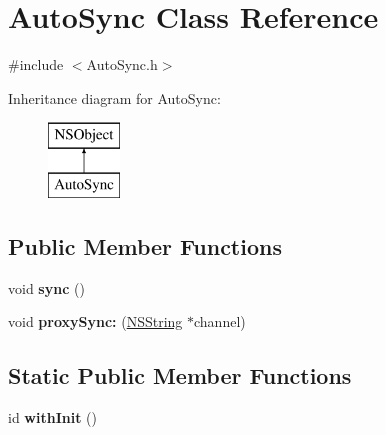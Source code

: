 \hypertarget{interface_auto_sync}{
\section{\-Auto\-Sync \-Class \-Reference}
\label{interface_auto_sync}
}


{\ttfamily \#include $<$\-Auto\-Sync.\-h$>$}

\-Inheritance diagram for \-Auto\-Sync\-:\begin{figure}[H]
\begin{center}
\leavevmode
\includegraphics[height=2.000000cm]{interface_auto_sync}
\end{center}
\end{figure}
\subsection*{\-Public \-Member \-Functions}
\begin{DoxyCompactItemize}
\item 
\hypertarget{interface_auto_sync_a6cfa02702aee2cbab3bd3aac5bd4e85a}{
void {\bfseries sync} ()}
\label{interface_auto_sync_a6cfa02702aee2cbab3bd3aac5bd4e85a}

\item 
\hypertarget{interface_auto_sync_a2705463f927f7f963182ac5cf69cd0ba}{
void {\bfseries proxy\-Sync\-:} (\hyperlink{class_n_s_string}{\-N\-S\-String} $\ast$channel)}
\label{interface_auto_sync_a2705463f927f7f963182ac5cf69cd0ba}

\end{DoxyCompactItemize}
\subsection*{\-Static \-Public \-Member \-Functions}
\begin{DoxyCompactItemize}
\item 
\hypertarget{interface_auto_sync_ae9d2e39a2d0b59ac270dd9aa38c7f3bc}{
id {\bfseries with\-Init} ()}
\label{interface_auto_sync_ae9d2e39a2d0b59ac270dd9aa38c7f3bc}

\end{DoxyCompactItemize}


